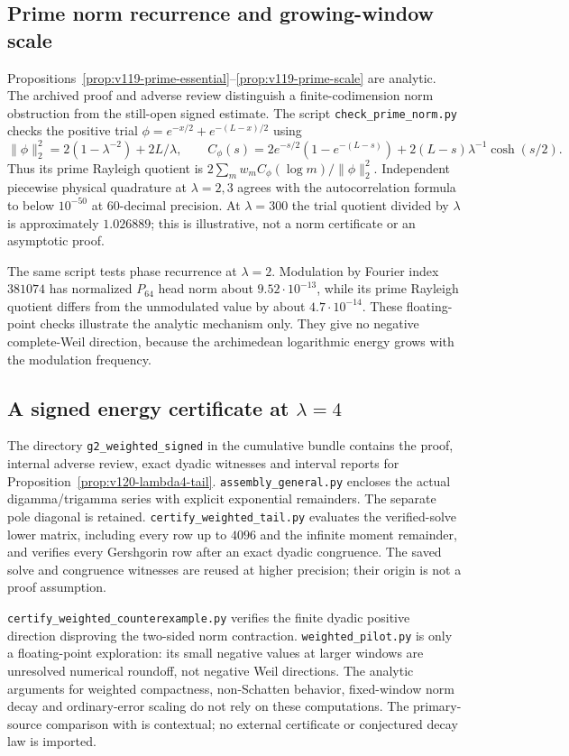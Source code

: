 \documentclass[11pt]{article}
\theoremstyle{remark}
\begin{document}
\subsection*{Prime norm recurrence and growing-window scale}
Propositions~\ref{prop:v119-prime-essential}--\ref{prop:v119-prime-scale}
are analytic. The archived proof and adverse review distinguish a
finite-codimension norm obstruction from the still-open signed estimate.
The script \texttt{check\_prime\_norm.py} checks the positive trial
$\phi=e^{-x/2}+e^{-(L-x)/2}$ using
\[
 \|\phi\|_2^2=2(1-\lambda^{-2})+2L/\lambda,
 \qquad
 C_\phi(s)=2e^{-s/2}(1-e^{-(L-s)})
             +2(L-s)\lambda^{-1}\cosh(s/2).
\]
Thus its prime Rayleigh quotient is
$2\sum_m w_m C_\phi(\log m)/\|\phi\|_2^2$.
Independent piecewise physical quadrature at $\lambda=2,3$ agrees
with the autocorrelation formula to below $10^{-50}$ at 60-decimal
precision. At $\lambda=300$ the trial quotient divided by $\lambda$
is approximately $1.026889$; this is illustrative, not a norm certificate
or an asymptotic proof.

The same script tests phase recurrence at $\lambda=2$. Modulation by
Fourier index $381074$ has normalized $P_{64}$ head norm about
$9.52\cdot10^{-13}$, while its prime Rayleigh quotient differs from
the unmodulated value by about $4.7\cdot10^{-14}$.
These floating-point checks illustrate the analytic mechanism only.
They give no negative complete-Weil direction, because the
archimedean logarithmic energy grows with the modulation frequency.

\subsection*{A signed energy certificate at $\lambda=4$}
The directory \texttt{g2\_weighted\_signed} in the cumulative bundle
contains the proof, internal adverse review, exact dyadic witnesses
and interval reports for Proposition~\ref{prop:v120-lambda4-tail}.
\texttt{assembly\_general.py} encloses the actual digamma/trigamma
series with explicit exponential remainders. The separate pole diagonal
is retained. \texttt{certify\_weighted\_tail.py} evaluates the
verified-solve lower matrix, including every row up to $4096$ and the
infinite moment remainder, and verifies every Gershgorin row after an
exact dyadic congruence. The saved solve and congruence witnesses are
reused at higher precision; their origin is not a proof assumption.

\texttt{certify\_weighted\_counterexample.py} verifies the finite
dyadic positive direction disproving the two-sided norm contraction.
\texttt{weighted\_pilot.py} is only a floating-point exploration:
its small negative values at larger windows are unresolved numerical
roundoff, not negative Weil directions. The analytic arguments for
weighted compactness, non-Schatten behavior, fixed-window norm decay
and ordinary-error scaling do not rely on these computations.
The primary-source comparison with \cite{Zhu2026Windows} is contextual;
no external certificate or conjectured decay law is imported.
\end{document}
